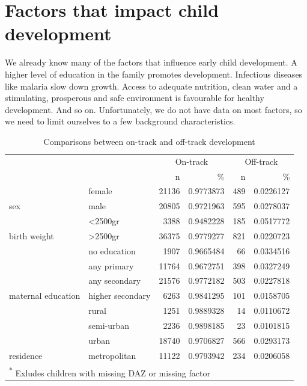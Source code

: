 \documentclass[
]{book}
\begin{document}
\hypertarget{sec:factors}{%
\section{Factors that impact child development}\label{sec:factors}}

We already know many of the factors that influence early child development. A higher level of education in the family promotes development. Infectious diseases like malaria slow down growth. Access to adequate nutrition, clean water and a stimulating, prosperous and safe environment is favourable for healthy development. And so on. Unfortunately, we do not have data on most factors, so we need to limit ourselves to a few background characteristics.

\begin{table}

\caption{\label{tab:ontracktab}Comparisons between on-track and off-track development}
\centering
\begin{tabular}[t]{l|l|r|r|r|r}
\hline
\multicolumn{2}{c|}{ } & \multicolumn{2}{c|}{On-track} & \multicolumn{2}{c}{Off-track} \\
\cline{3-4} \cline{5-6}
 &  & n & \% & n & \%\\
\hline
 & female & 21136 & 0.9773873 & 489 & 0.0226127\\
\cline{2-6}
\multirow[t]{-2}{*}{\raggedright\arraybackslash sex} & male & 20805 & 0.9721963 & 595 & 0.0278037\\
\cline{1-6}
 & <2500gr & 3388 & 0.9482228 & 185 & 0.0517772\\
\cline{2-6}
\multirow[t]{-2}{*}{\raggedright\arraybackslash birth weight} & >2500gr & 36375 & 0.9779277 & 821 & 0.0220723\\
\cline{1-6}
 & no education & 1907 & 0.9665484 & 66 & 0.0334516\\
\cline{2-6}
 & any primary & 11764 & 0.9672751 & 398 & 0.0327249\\
\cline{2-6}
 & any secondary & 21576 & 0.9772182 & 503 & 0.0227818\\
\cline{2-6}
\multirow[t]{-4}{*}{\raggedright\arraybackslash maternal education} & higher secondary & 6263 & 0.9841295 & 101 & 0.0158705\\
\cline{1-6}
 & rural & 1251 & 0.9889328 & 14 & 0.0110672\\
\cline{2-6}
 & semi-urban & 2236 & 0.9898185 & 23 & 0.0101815\\
\cline{2-6}
 & urban & 18740 & 0.9706827 & 566 & 0.0293173\\
\cline{2-6}
\multirow[t]{-4}{*}{\raggedright\arraybackslash residence} & metropolitan & 11122 & 0.9793942 & 234 & 0.0206058\\
\hline
\multicolumn{6}{l}{\textsuperscript{*} Exludes children with missing DAZ or missing factor}\\
\end{tabular}
\end{table}
\end{document}
